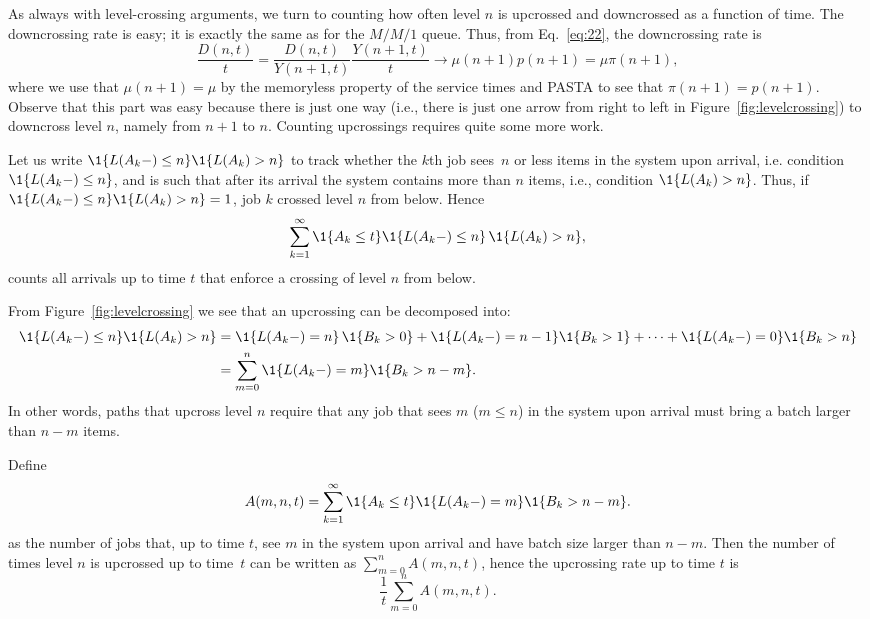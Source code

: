 As always with level-crossing arguments, we turn to counting how often
level $n$ is upcrossed and downcrossed as a function of time. The
downcrossing rate is easy; it is exactly the same as for the $M/M/1$
queue. Thus, from Eq.~\eqref{eq:22}, the downcrossing rate is
\begin{equation}
\frac{D(n,t)}t = \frac{D(n,t)}{Y(n+1,t)}\frac{Y(n+1,t)}t \to  \mu(n+1) p(n+1) = \mu \pi(n+1),
\end{equation}
where we use that $\mu(n+1) = \mu$ by the memoryless property of the
service times and PASTA to see that $\pi(n+1)=p(n+1)$.  Observe that
this part was easy because there is just one way (i.e., there is just
one arrow from right to left in Figure~\ref{fig:levelcrossing}) to
downcross level $n$, namely from $n+1$ to $n$. Counting upcrossings
requires quite some more work.

Let us write $\1{L(A_k-) \leq n}\1{ L(A_k)>n}$ to track whether the
$k$th job sees~$n$ or less items in the system upon arrival,
i.e. condition $\1{L(A_k-)\leq n}$, and is such that after its arrival
the system contains more than $n$ items, i.e., condition
$\1{L(A_k) > n}$. Thus, if $\1{L(A_k-) \leq n}\1{ L(A_k)>n}=1$, job $k$ crossed level $n$ from below. Hence
\begin{equation*}
  \sum_{k=1}^{\infty} \1{A_k \leq t} \1{L(A_k-) \leq n}\,\1{L(A_k)>n},
\end{equation*}
counts all arrivals up to time $t$ that enforce a crossing of level
$n$ from below.


From Figure~\ref{fig:levelcrossing} we see that an upcrossing can be decomposed into:
\begin{equation*}
  \begin{split}
    \1{L(A_k-) \leq n}\1{L(A_k)>n} 
&=  \1{L(A_k-) =n}\, \1{B_k >0} + \1{L(A_k-) =n-1}\1{ B_k >1} +\cdots + \1{L(A_k-) =0}\1{B_k > n} \\
& = \sum_{m=0}^n \1{L(A_k-) =m}\1{B_k > n-m}.
  \end{split}
\end{equation*}
In other words, paths that upcross level $n$ require that any job that
sees $m$ ($m\leq n$) in the system upon arrival must bring a batch larger
than $n-m$ items.

Define 
\begin{equation*}
  A(m,n,t) = \sum_{k=1}^\infty \1{A_k \leq t}\1{L(A_k-) = m}\1{B_k > n-m}.
\end{equation*}
as the number of jobs that, up to time $t$, see $m$ in the system upon
arrival and have batch size larger than $n-m$. Then the number of
times level $n$ is upcrossed up to time~$t$ can be written as
$\sum_{m=0}^n A(m,n,t)$, hence the upcrossing rate up to time $t$ is
\begin{equation*}
\frac 1t  \sum_{m=0}^n A(m,n,t).
\end{equation*}

